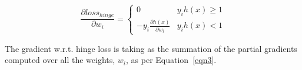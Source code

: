 \begin{equation}
\frac{\partial{loss_{hinge}}}{\partial w_i}=
\begin{cases}
0  & y_ih(x) \geq 1 \\
-y_i\frac{\partial{h(x)}}{\partial w_i} & y_ih(x) < 1
\end{cases}
\label{eqn3}
\end{equation}

The gradient w.r.t. hinge loss is taking as the summation of the partial gradients computed over all the weights, $w_i$, as per Equation~\ref{eqn3}.